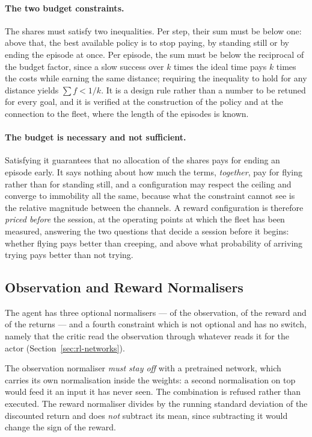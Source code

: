 \paragraph{The two budget constraints.}
The shares must satisfy two inequalities. Per step, their sum must be below one:
above that, the best available policy is to stop paying, by standing still or by
ending the episode at once. Per episode, the sum must be below the reciprocal of
the budget factor, since a slow success over $k$ times the ideal time pays $k$
times the costs while earning the same distance; requiring the inequality to
hold for any distance yields $\sum f < 1/k$. It is a design rule rather than a
number to be retuned for every goal, and it is verified at the construction of
the policy and at the connection to the fleet, where the length of the episodes
is known.

\paragraph{The budget is necessary and not sufficient.}
Satisfying it guarantees that no allocation of the shares pays for ending an
episode early. It says nothing about how much the terms, \emph{together}, pay
for flying rather than for standing still, and a configuration may respect the
ceiling and converge to immobility all the same, because what the constraint
cannot see is the relative magnitude between the channels. A reward
configuration is therefore \emph{priced before} the session, at the operating
points at which the fleet has been measured, answering the two questions that
decide a session before it begins: whether flying pays better than creeping, and
above what probability of arriving trying pays better than not trying.

\subsection{Observation and Reward Normalisers}
\label{sec:rl-normalisers}

The agent has three optional normalisers --- of the observation, of the reward
and of the returns --- and a fourth constraint which is not optional and has no
switch, namely that the critic read the observation through whatever reads it
for the actor (Section~\ref{sec:rl-networks}).

The observation normaliser \emph{must stay off} with a pretrained network, which
carries its own normalisation inside the weights: a second normalisation on top
would feed it an input it has never seen. The combination is refused rather than
executed. The reward normaliser divides by the running standard deviation of the
discounted return and does \emph{not} subtract its mean, since subtracting it
would change the sign of the reward.

